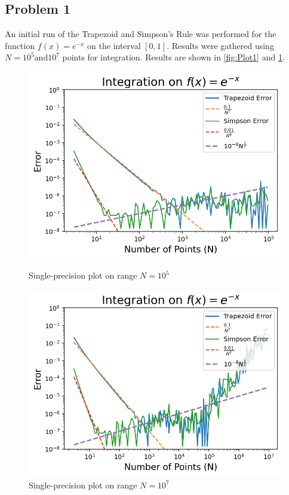 \documentclass[aps,prb,groupedaddress,nofootinbib,floatfix]{revtex4}
\begin{document}
\subsection*{Problem 1}
An initial run of the Trapezoid and Simpson's Rule was performed for the function $f(x)=e^{-x}$ on the interval $[0,1]$. Results were gathered using $N=10^{5} \text{and} 10^{7}$ points for integration. Results are shown in \ref{fig:Plot1} and \ref{fig:Plot2}. 
\begin{figure}
	\begin{minipage}[c]{0.4\linewidth}
		\includegraphics[width=\linewidth]{Plot1(10^5).png}
		\caption{Single-precision plot on range $N=10^{5}$ }
		\label{fig:Plot1}
	\end{minipage}
	\begin{minipage}[c]{0.4\linewidth}
		\includegraphics[width=\linewidth]{Plot1(10^7).png}
		\caption{Single-precision plot on range $N=10^{7}$ }
		\label{fig:Plot2}
	\end{minipage}
\end{figure}
\end{document}
